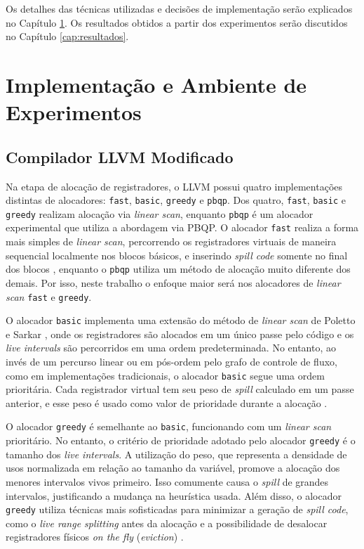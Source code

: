 \documentclass[
	12pt,				%
	openright,			%
	twoside,			%
	a4paper,			%
	tcc,			%
	]{ABNT-DC-UEL}
\begin{document}
Os detalhes das técnicas utilizadas e decisões de implementação serão explicados no Capítulo \ref{cap:ambiente-de-experimentos}. Os resultados obtidos a partir dos experimentos serão discutidos no Capítulo \ref{cap:resultados}.

\chapter{Implementação e Ambiente de Experimentos} \label{cap:ambiente-de-experimentos}

\section{Compilador LLVM Modificado}

Na etapa de alocação de registradores, o LLVM possui quatro implementações distintas de alocadores: \texttt{fast}, \texttt{basic}, \texttt{greedy} e \texttt{pbqp}. Dos quatro, \texttt{fast}, \texttt{basic} e \texttt{greedy} realizam alocação via \textit{linear scan}, enquanto \texttt{pbqp} é um alocador experimental que utiliza a abordagem via PBQP. O alocador \texttt{fast} realiza a forma mais simples de \textit{linear scan}, percorrendo os registradores virtuais de maneira sequencial localmente nos blocos básicos, e inserindo \textit{spill code} somente no final dos blocos \cite{xavier:12}, enquanto o \texttt{pbqp} utiliza um método de alocação muito diferente dos demais. Por isso, neste trabalho o enfoque maior será nos alocadores de \textit{linear scan} \texttt{fast} e \texttt{greedy}. 

O alocador \texttt{basic} implementa uma extensão do método de \textit{linear scan} de Poletto e Sarkar \cite{poletto:99}, onde os registradores são alocados em um único passe pelo código e os \textit{live intervals} são percorridos em uma ordem predeterminada. No entanto, ao invés de um percurso linear ou em pós-ordem pelo grafo de controle de fluxo, como em implementações tradicionais, o alocador \texttt{basic} segue uma ordem prioritária. Cada registrador virtual tem seu peso de \textit{spill} calculado em um passe anterior, e esse peso é usado como valor de prioridade durante a alocação \cite{xavier:12}. %

O alocador \texttt{greedy} é semelhante ao \texttt{basic}, funcionando com um \textit{linear scan} prioritário. No entanto, o critério de prioridade adotado pelo alocador \texttt{greedy} é o tamanho dos \textit{live intervals}. A utilização do peso, que representa a densidade de usos normalizada em relação ao tamanho da variável, promove a alocação dos menores intervalos vivos primeiro. Isso comumente causa o \textit{spill} de grandes intervalos, justificando a mudança na heurística usada. Além disso, o alocador \texttt{greedy} utiliza técnicas mais sofisticadas para minimizar a geração de \textit{spill code}, como o \textit{live range splitting} antes da alocação e a possibilidade de desalocar registradores físicos \textit{on the fly} (\textit{eviction}) \cite{xavier:12}.
\end{document}
